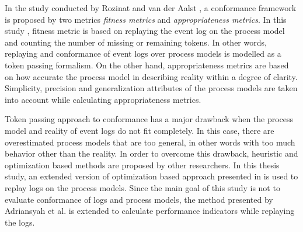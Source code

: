 In the study conducted by Rozinat and van der Aalst \cite{rozinat2008conformance}, a conformance framework is proposed by two metrics \textit{fitness metrics} and \textit{appropriateness metrics}. In this study \cite{rozinat2008conformance}, fitness metric is based on replaying the event log on the process model and counting the number of missing or remaining tokens. In other words, replaying and conformance of event logs over process models is modelled as a token passing formalism. On the other hand, appropriateness metrics are based on how accurate the process model in describing reality within a degree of clarity. Simplicity, precision and generalization attributes of the process models are taken into account while calculating appropriateness metrics.

Token passing approach to conformance has a major drawback when the process model and reality of event logs do not fit completely. In this case, there are overestimated process models that are too general, in other words with too much behavior other than the reality. In order to overcome this drawback, heuristic and optimization based methods are proposed by other researchers. In this thesis study, an extended version of optimization based approach presented in \cite{adriansyah2011conformance} is used to replay logs on the process models. Since the main goal of this study is not to evaluate conformance of logs and process models, the method presented by Adriansyah et al. is extended to calculate performance indicators while replaying the logs.
